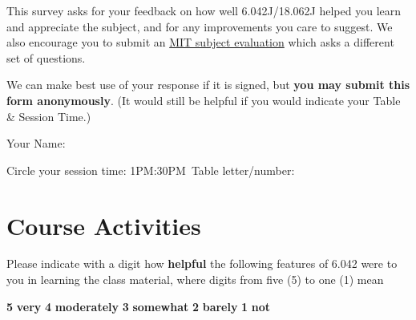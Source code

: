 \documentclass[handout]{mcs}
\begin{document}

This survey asks for your feedback on how well 6.042J/18.062J helped
you learn and appreciate the subject, and \iffalse .  Comparing
student self-assessments given in this survey to student grades helps
us determine how to improve the course.  We would also be grateful\fi
for any improvements you care to suggest.  We also encourage you to
submit an
\href{http://web.mit.edu/subjectevaluation/evaluate.html}{MIT subject
  evaluation} which asks a different set of questions.

We can make best use of your response if it is signed, but \textbf{you
  may submit this form anonymously}.  (It would still be helpful if
you would indicate your Table \& Session Time.)

\large{Your Name:} \brule{4in}

Circle your session time: 1PM:30PM\qquad\  Table letter/number: \brule{0.5in}

\section*{Course Activities}

Please indicate with a digit how \textbf{helpful} the following
features of 6.042 were to you in learning the class material, where
digits from five (5) to one (1) mean
\begin{center}
\textbf{5}  \textbf{very} \qquad
\textbf{4}  \textbf{moderately}\qquad
\textbf{3} \textbf{somewhat}\qquad
\textbf{2} \textbf{barely}\qquad
\textbf{1} \textbf{not}
\end{center}

\iffalse
How helpful have the following aspects of the course been in
achieving the subject outcomes for you personally:
\fi
\end{document}

